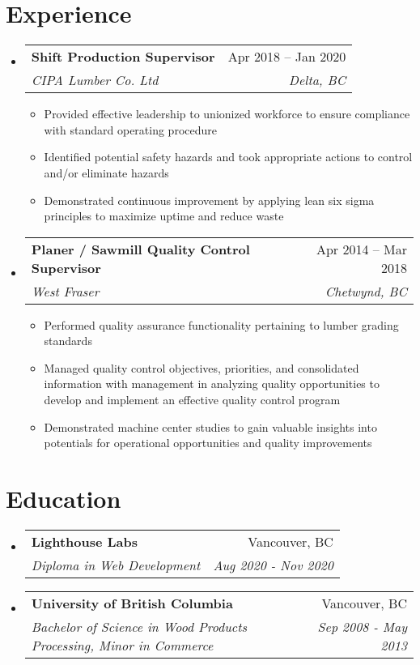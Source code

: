 \documentclass[letterpaper,10.5pt]{article}
\makeatletter
\newcommand{\resumeItem}[1]{
  \item\small{
    {#1 \vspace{-2pt}}
  }
}
\newcommand{\resumeSubheading}[4]{
  \vspace{-2pt}\item
    \begin{tabular*}{0.97\textwidth}[t]{l@{\extracolsep{\fill}}r}
      \textbf{#1} & #2 \\
      \textit{\small#3} & \textit{\small #4} \\
    \end{tabular*}\vspace{-7pt}
}
\newcommand{\resumeSubHeadingListStart}{\begin{itemize}[leftmargin=0.15in, label={}]}
\newcommand{\resumeSubHeadingListEnd}{\end{itemize}}
\newcommand{\resumeItemListStart}{\begin{itemize}}
\newcommand{\resumeItemListEnd}{\end{itemize}\vspace{-5pt}}
\makeatother
\begin{document}
\section{Experience}
  \resumeSubHeadingListStart

    \resumeSubheading
      {Shift Production Supervisor}{Apr 2018 -- Jan 2020}
      {CIPA Lumber Co. Ltd}{Delta, BC}
      \resumeItemListStart
        \resumeItem{Provided effective leadership to unionized workforce to ensure compliance with standard operating procedure}
        \resumeItem{Identified potential safety hazards and took appropriate actions to control and/or eliminate hazards }
        \resumeItem{Demonstrated continuous improvement by applying lean six sigma principles to maximize uptime and reduce waste}
      \resumeItemListEnd

    \resumeSubheading
      {Planer / Sawmill Quality Control Supervisor}{Apr 2014 -- Mar 2018}
      {West Fraser}{Chetwynd, BC}
      \resumeItemListStart
        \resumeItem{Performed quality assurance functionality pertaining to lumber grading standards  }
        \resumeItem{Managed quality control objectives, priorities, and consolidated information with management in analyzing quality opportunities to develop and implement an effective quality control program}
        \resumeItem{Demonstrated machine center studies to gain valuable insights into potentials for operational opportunities and quality improvements}
    \resumeItemListEnd


  \resumeSubHeadingListEnd
  
\section{Education}
  \resumeSubHeadingListStart
    \resumeSubheading
      {Lighthouse Labs}{Vancouver, BC}
      {Diploma in Web Development}{Aug 2020 - Nov 2020}
    \resumeSubheading
      {University of British Columbia}{Vancouver, BC}
      {Bachelor of Science in Wood Products Processing, Minor in Commerce}{Sep 2008 - May 2013}
  \resumeSubHeadingListEnd

\end{document}

